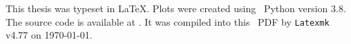 \documentclass[\relativeRoot/main.tex]{subfiles}
\begin{document}
\printglossary[
    title={Abbreviations},
    type=acronym,
    style=long
]
    
\printbibliography[
    title={Bibliography},
    heading=bibintoc
]

\cleardoublepage
{}
{}
\listoffigures

\cleardoublepage
{}
{}
\listoftables

\vfill

This thesis was typeset in \LaTeX. Plots were created using ~Python version 3.8. The source code is available at . It was compiled into this ~PDF by \texttt{Latexmk} v4.77 on \today.
\end{document}
